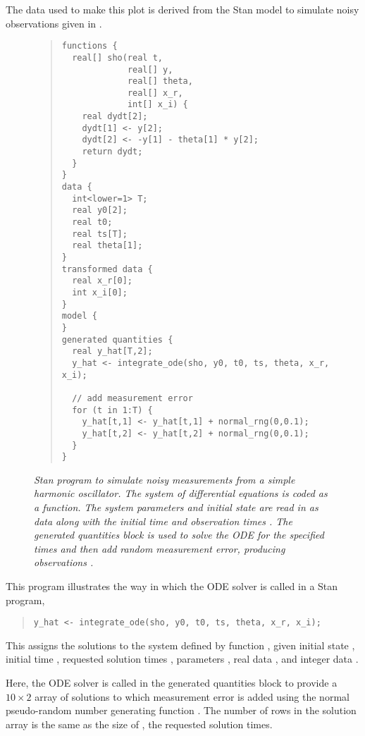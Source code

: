 The data used to make this plot is derived from the Stan model to
simulate noisy observations given in .
%
\begin{figure}
\begin{quote}\small
\begin{Verbatim}
functions {
  real[] sho(real t,
             real[] y, 
             real[] theta,
             real[] x_r,
             int[] x_i) {
    real dydt[2];
    dydt[1] <- y[2];
    dydt[2] <- -y[1] - theta[1] * y[2];
    return dydt;
  }
}
data {
  int<lower=1> T;
  real y0[2];
  real t0;
  real ts[T];
  real theta[1];
}
transformed data {
  real x_r[0];
  int x_i[0];
}
model {
}
generated quantities {
  real y_hat[T,2];
  y_hat <- integrate_ode(sho, y0, t0, ts, theta, x_r, x_i);

  // add measurement error
  for (t in 1:T) {
    y_hat[t,1] <- y_hat[t,1] + normal_rng(0,0.1);
    y_hat[t,2] <- y_hat[t,2] + normal_rng(0,0.1);
  }
}
\end{Verbatim}
\end{quote}
\vspace*{-0.2in}
\caption{\small\it Stan program to simulate noisy measurements from a
  simple harmonic oscillator.  The system of differential equations is
  coded as a function.  The system parameters  and initial
  state  are read in as data along with the initial time
   and observation times . The generated quantities
  block is used to solve the ODE for the specified times and then add
  random measurement error, producing observations .}\label{sho-sim.figure}
\end{figure}

This program illustrates the way in which the ODE solver is called in
a Stan program,
%
\begin{quote}
\begin{Verbatim}
y_hat <- integrate_ode(sho, y0, t0, ts, theta, x_r, x_i);
\end{Verbatim}
\end{quote}
%
This assigns the solutions to the system defined by function
, given initial state , initial time ,
requested solution times , parameters , real data
, and integer data .

Here, the ODE solver is called in the generated quantities block to
provide a $10 \times 2$ array of solutions  to
which measurement error is added using the normal pseudo-random number
generating function .  The number of rows in the
solution array is the same as the size of , the requested
solution times.

